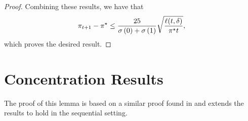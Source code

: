 \begin{proof}
        Combining these results, we have that
        \begin{equation}
            \policy[\round + 1] - \neymanPolicy \leq \frac{25}{\stdev[\cidx] + \stdev[\tidx]}\sqrt{\frac{\ell(\round, \errorProb)}{\neymanPolicy \round}},
        \end{equation}
        which proves the desired result.
        \end{proof}
    
    
        
\section{Concentration Results}

The proof of this lemma is based on a similar proof found in \cite{audibert2006use} and extends the results to hold in the sequential setting.

